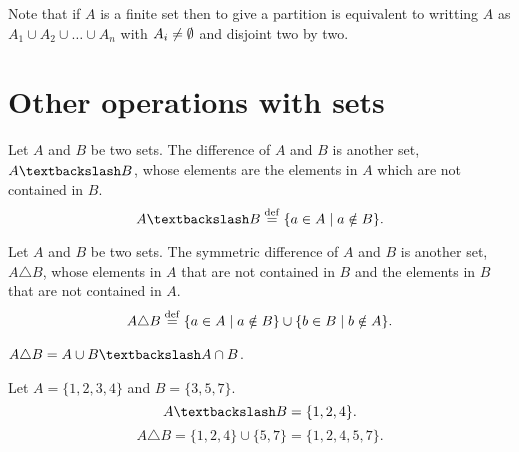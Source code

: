 \begin{remark}
    Note that if $A$ is a finite set then to give a partition is equivalent to writting $A$ as $A_1\cup A_2\cup\ldots\cup A_{n} $ with $A_i\neq \emptyset$ and disjoint two by two.
\end{remark}


\section{Other operations with sets}
\begin{defi}[Difference]
    Let $A$ and $B$ be two sets. The difference of $A$ and $B$ is another set, $A\textbackslash B$, whose elements are the elements in $A$ which are not contained in $B$.
    \begin{equation}
        A\textbackslash B \bydef \{a\in A \st a\notin B \}.
    \end{equation}
\end{defi}

\begin{defi}
    Let $A$ and $B$ be two sets. The symmetric difference of $A$ and $B$ is another set, $A\triangle B$, whose elements in $A$ that are not contained in $B$ and the elements in $B$ that are not contained in $A$.
    \begin{equation}
        A\triangle B \overset{\mathrm{def}}{=} \{a\in A\; | \; a\notin B \}\cup \{b\in B\; | \; b\notin A \}.
    \end{equation}
\end{defi}

\begin{remark}
    $A\triangle B = A\cup B \textbackslash A\cap B$.
\end{remark}

\begin{example}
    Let $A = \{1, 2, 3, 4\} $ and $B = \{3, 5, 7\} $.
    \begin{equation}
        A\textbackslash B = \{1, 2, 4\}.
    \end{equation}
    \begin{equation}
        A\triangle B = \{1, 2, 4\}\cup \{5, 7\} = \{1, 2, 4, 5, 7\}.
    \end{equation}
\end{example}

